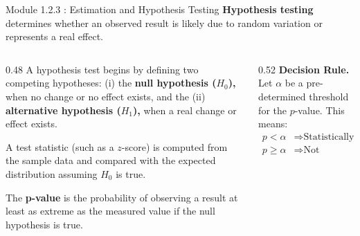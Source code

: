 \documentclass{beamer}
\begin{document}
\begin{frame}{Module 1.2.3 : Estimation and Hypothesis Testing}
\scriptsize
\textbf{Hypothesis testing} determines whether an observed result is likely due to random variation or represents a real effect.
\vspace{0.25cm}
\begin{columns}[T]
\begin{column}{0.48\textwidth}
\scriptsize
A hypothesis test begins by defining two competing hypotheses: (i) the \textbf{null hypothesis ($H_0$),} when no change or no effect exists, and the (ii) \textbf{alternative hypothesis ($H_1$),} when a real change or effect exists. \\ \vspace{0.2cm}

A test statistic (such as a $z$-score) is computed from the sample data and compared with the expected distribution assuming $H_0$ is true. \\ \vspace{0.2cm}

The \textbf{p-value} is the probability of observing a result at least as extreme as the measured value if the null hypothesis is true.
\end{column}
\begin{column}{0.52\textwidth}
\textbf{Decision Rule.} Let $\alpha$ be a pre-determined threshold for the $p$-value.  This means:
\[
\boxed{
\begin{array}{ll}
p<\alpha & \Rightarrow \text{Statistically significant} \\
p\ge\alpha & \Rightarrow \text{Not statistically significant}
\end{array}
}
\]
\scriptsize
\end{column}
\end{columns}
\end{frame}
\end{document}
